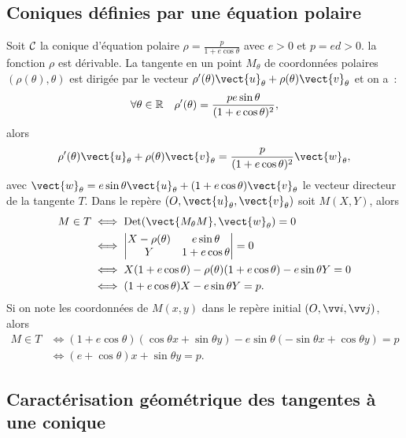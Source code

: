\subsection{Coniques définies par une équation polaire}

Soit $\mathcal{C}_{}$ la conique d'équation polaire $\rho=\frac{p}{1+e\cos \theta}$ avec $e>0$ et $p=ed>0$. la fonction $\rho$ est dérivable. La tangente en un point $M_{\theta}$ de coordonnées polaires $(\rho(\theta),\theta)$ est dirigée par le vecteur $\rho'(\theta) \vect{u}_\theta + \rho(\theta) \vect{v}_\theta$ et on a~:
\begin{equation}
  \forall \theta \in \mathbb{R} \quad \rho'(\theta)=\frac{pe\sin\theta}{(1+e\cos\theta)^2},
\end{equation}
alors
\begin{equation}
  \rho'(\theta) \vect{u}_\theta + \rho(\theta) \vect{v}_\theta = \frac{p}{(1+e\cos\theta)^2} \vect{w}_\theta,
\end{equation}
avec $\vect{w}_\theta = e\sin\theta\vect{u}_\theta + (1+e\cos\theta)\vect{v}_\theta$ le vecteur directeur de la tangente $T$. Dans le repère $(O,\vect{u}_\theta, \vect{v}_\theta)$ soit $M(X,Y)$, alors 
\begin{align}
  M \in T & \iff  \Det(\vect{M_\theta M},\vect{w}_\theta)=0 \\ 
  & \iff \begin{vmatrix} X-\rho(\theta) & e\sin\theta \\ Y & 1+e\cos\theta \end{vmatrix} = 0 \\
  & \iff X(1+e\cos\theta)-\rho(\theta)(1+e\cos\theta)-e\sin\theta Y = 0\\
  & \iff (1+e\cos\theta)X-e\sin\theta Y=p.
\end{align}
Si on note les coordonnées de $M(x,y)$ dans le repère initial $\rond$, alors 
\begin{align}
  M \in T &\iff (1+e\cos\theta)(\cos\theta x+\sin\theta y)-e\sin\theta(-\sin\theta x+\cos\theta y)=p\\
&\iff (e+\cos\theta)x+\sin\theta y=p.
\end{align}

\subsection{Caractérisation géométrique des tangentes à une conique}
